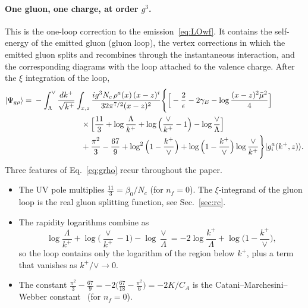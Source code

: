 \paragraph*{One gluon, one charge, at order $g^3$.} This is the one-loop correction to the emission~\eqref{eq:LOwf}. It contains the self-energy of the emitted gluon (gluon loop), the vertex corrections in which the emitted gluon splits and recombines through the instantaneous interaction, and the corresponding diagrams with the loop attached to the valence charge. After the $\xi$ integration of the loop,
\begin{align}
|\Psi_{g\rho}\rangle={}&-\int_{\Lambda}^{\vee}\frac{dk^+}{\sqrt{k^+}}\int_{x,z}\frac{ig^3N_c\,\rho^a(x)\,(x-z)^i}{32\pi^{7/2}(x-z)^2}\Bigg\{\Big[-\frac2\epsilon-2\gamma_E-\log\frac{(x-z)^2\bar\mu^2}{4}\Big]\notag\\
&\hspace{6em}\times\Big[\frac{11}{3}+\log\frac{\Lambda}{k^+}+\log\Big(\frac{\vee}{k^+}-1\Big)-\log\frac{\vee}{\Lambda}\Big]\notag\\
&\hspace{6em}+\frac{\pi^2}{3}-\frac{67}{9}+\log^2\Big(1-\frac{k^+}{\vee}\Big)+\log\Big(1-\frac{k^+}{\vee}\Big)\log\frac{\vee}{k^+}\Bigg\}|g^a_i(k^+,z)\rangle .
\label{eq:grho}
\end{align}
Three features of Eq.~\eqref{eq:grho} recur throughout the paper.
\begin{itemize}
\item The UV pole multiplies $\frac{11}{3}=\beta_0/N_c$ (for $n_f=0$). The $\xi$-integrand of the gluon loop is the real gluon splitting function, see Sec.~\ref{sec:rc}.
\item The rapidity logarithms combine as
\begin{equation}
\log\frac{\Lambda}{k^+}+\log\Big(\frac{\vee}{k^+}-1\Big)-\log\frac{\vee}{\Lambda}=-2\log\frac{k^+}{\Lambda}+\log\Big(1-\frac{k^+}{\vee}\Big),
\label{eq:grhologs}
\end{equation}
so the loop contains only the logarithm of the region below $k^+$, plus a term that vanishes as $k^+/\vee\to0$.
\item The constant $\frac{\pi^2}{3}-\frac{67}{9}=-2\big(\frac{67}{18}-\frac{\pi^2}{6}\big)=-2K/C_A$ is the Catani--Marchesini--Webber constant~\cite{Catani:1990rr} (for $n_f=0$).
\end{itemize}

